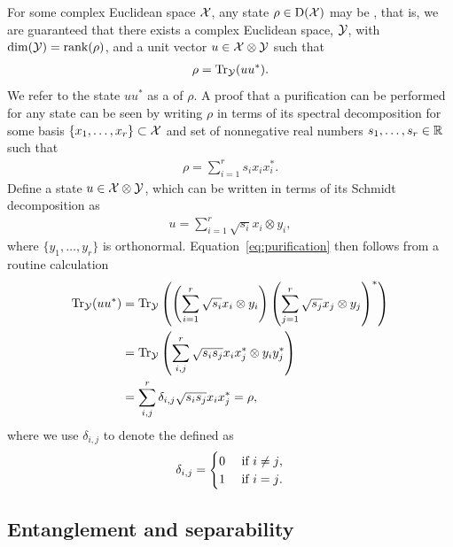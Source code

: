 For some complex Euclidean space $\mathcal{X}$, any state $\rho \in \mathrm{D}(\mathcal{X})$ may be , that is, we are guaranteed that there exists a complex Euclidean space, $\mathcal{Y}$, with $\dim(\mathcal{Y}) = \operatorname{rank}(\rho)$, and a unit vector $u \in \mathcal{X} \otimes \mathcal{Y}$ such that 
\begin{align} \label{eq:purification}
	\rho = \operatorname{Tr}_{\mathcal{Y}}(uu^*).
\end{align}
We refer to the state $uu^*$ as a  of $\rho$. A proof that a purification can be performed for any state can be seen by writing $\rho$ in terms of its spectral decomposition for some basis $\{ x_1, \ldots, x_r \} \subset \mathcal{X}$ and set of nonnegative real numbers $s_1, \ldots, s_r \in \mathbb{R}$ such that
\begin{align}
	\rho = \sum_{i=1}^r s_i x_i x_i^*.
\end{align} 
Define a state $u \in \mathcal{X} \otimes \mathcal{Y}$, which can be written in terms of its Schmidt decomposition as 
\begin{align}
	u = \sum_{i=1}^r \sqrt{s_i}x_i \otimes y_i,
\end{align}
where $\{ y_1, \ldots, y_r \}$ is orthonormal. Equation~\eqref{eq:purification} then follows from a routine calculation
\begin{equation}
	\begin{aligned}
		\operatorname{Tr}_{\mathcal{Y}}(uu^*) &= \operatorname{Tr}_{\mathcal{Y}} \left( \left( \sum_{i=1}^r \sqrt{s_i} x_i \otimes y_i \right) \left( \sum_{j=1}^r \sqrt{s_j} x_j \otimes y_j \right)^* \right) \\
		&= \operatorname{Tr}_{\mathcal{Y}} \left( \sum_{i,j}^r \sqrt{s_i s_j} x_i x_j^* \otimes y_i y_j^* \right) \\
		&= \sum_{i,j}^r \delta_{i,j} \sqrt{s_i s_j} x_i x_j^* = \rho,
	\end{aligned}
\end{equation}
where we use $\delta_{i,j}$ to denote the  defined as 
\[
\delta_{i,j} =
  \begin{cases} 
      \hfill 0 \hfill & \text{ if $i \not= j$}, \\
      \hfill 1 \hfill & \text{ if $i = j$}. 
  \end{cases}
\]


\subsection{Entanglement and separability}


